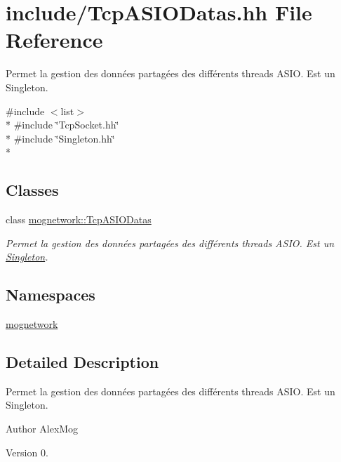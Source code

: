 \hypertarget{_tcp_a_s_i_o_datas_8hh}{\section{include/\-Tcp\-A\-S\-I\-O\-Datas.hh File Reference}
\label{_tcp_a_s_i_o_datas_8hh}
}


Permet la gestion des données partagées des différents threads A\-S\-I\-O. Est un Singleton.  


{\ttfamily \#include $<$list$>$}\\*
{\ttfamily \#include \char`\"{}Tcp\-Socket.\-hh\char`\"{}}\\*
{\ttfamily \#include \char`\"{}Singleton.\-hh\char`\"{}}\\*
\subsection*{Classes}
\begin{DoxyCompactItemize}
\item 
class \hyperlink{classmognetwork_1_1_tcp_a_s_i_o_datas}{mognetwork\-::\-Tcp\-A\-S\-I\-O\-Datas}
\begin{DoxyCompactList}\small\item\em Permet la gestion des données partagées des différents threads A\-S\-I\-O. Est un \hyperlink{classmognetwork_1_1_singleton}{Singleton}. \end{DoxyCompactList}\end{DoxyCompactItemize}
\subsection*{Namespaces}
\begin{DoxyCompactItemize}
\item 
\hyperlink{namespacemognetwork}{mognetwork}
\end{DoxyCompactItemize}


\subsection{Detailed Description}
Permet la gestion des données partagées des différents threads A\-S\-I\-O. Est un Singleton. \begin{DoxyAuthor}{Author}
Alex\-Mog 
\end{DoxyAuthor}
\begin{DoxyVersion}{Version}
0. 
\end{DoxyVersion}
